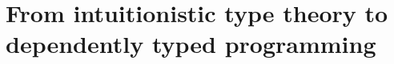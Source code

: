 \chapter{From intuitionistic type theory to dependently typed programming}
\label{chapter:background}
